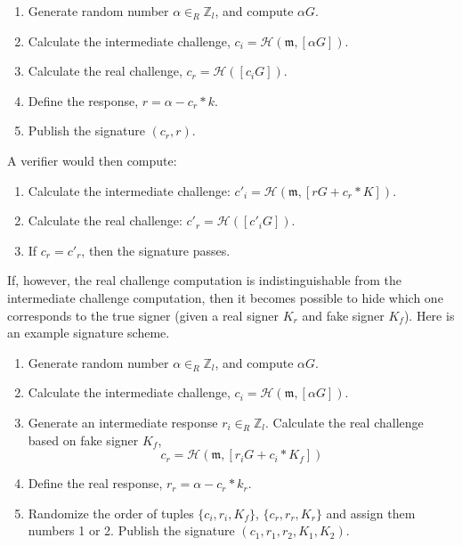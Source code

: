 \begin{enumerate}
	\item Generate random number $\alpha \in_R \mathbb{Z}_l$, and compute $\alpha G$.

	\item Calculate the intermediate challenge, \(c_i = \mathcal{H}(\mathfrak{m},[\alpha G])\).

	\item Calculate the real challenge, \(c_r = \mathcal{H}([c_i G])\).

	\item Define the response, $r = \alpha - c_r*k$.

	\item Publish the signature $(c_r, r)$.
\end{enumerate}

A verifier would then compute:

\begin{enumerate}
	\item Calculate the intermediate challenge: \(c'_i = \mathcal{H}(\mathfrak{m},[r G + c_r*K])\).

    \item Calculate the real challenge: \(c'_r = \mathcal{H}([c'_i G])\).

	\item If $c_r = c'_r$, then the signature passes.
\end{enumerate}

If, however, the real challenge computation is indistinguishable from the intermediate challenge computation, then it becomes possible to hide which one corresponds to the true signer (given a real signer $K_r$ and fake signer $K_f$). Here is an example signature scheme.

\begin{enumerate}
	\item Generate random number $\alpha \in_R \mathbb{Z}_l$, and compute $\alpha G$.

	\item Calculate the intermediate challenge, \(c_i = \mathcal{H}(\mathfrak{m},[\alpha G])\).
	
	\item Generate an intermediate response $r_i \in_R \mathbb{Z}_l$. Calculate the real challenge based on fake signer $K_f$,\vspace{.115cm}
	\[c_r = \mathcal{H}(\mathfrak{m},[r_i G + c_i*K_f])\]

	\item Define the real response, $r_r = \alpha - c_r*k_r$.

	\item Randomize the order of tuples $\{c_i, r_i, K_f\}$, $\{c_r, r_r, K_r\}$ and assign them numbers 1 or 2. Publish the signature $(c_1, r_1, r_2, K_1, K_2)$.
\end{enumerate}

